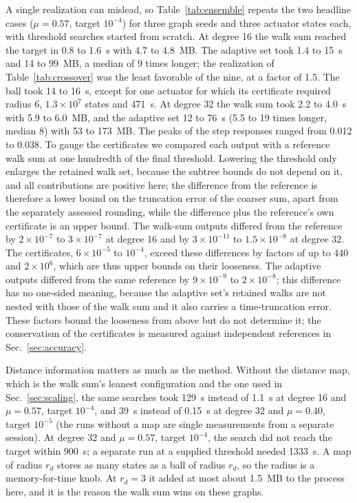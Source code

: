 A single realization can mislead, so Table~\ref{tab:ensemble} repeats the two headline cases ($\mu=0.57$, target $10^{-4}$) for three graph seeds and three actuator states each, with threshold searches started from scratch. At degree 16 the walk sum reached the target in 0.8 to 1.6~s with 4.7 to 4.8~MB. The adaptive set took 1.4 to 15~s and 14 to 99~MB, a median of 9 times longer; the realization of Table~\ref{tab:crossover} was the least favorable of the nine, at a factor of 1.5. The ball took 14 to 16~s, except for one actuator for which its certificate required radius 6, $1.3\times10^7$ states and 471~s. At degree 32 the walk sum took 2.2 to 4.0~s with 5.9 to 6.0~MB, and the adaptive set 12 to 76~s (5.5 to 19 times longer, median 8) with 53 to 173~MB. The peaks of the step responses ranged from 0.012 to 0.038. To gauge the certificates we compared each output with a reference walk sum at one hundredth of the final threshold. Lowering the threshold only enlarges the retained walk set, because the subtree bounds do not depend on it, and all contributions are positive here; the difference from the reference is therefore a lower bound on the truncation error of the coarser sum, apart from the separately assessed rounding, while the difference plus the reference's own certificate is an upper bound. The walk-sum outputs differed from the reference by $2\times10^{-7}$ to $3\times10^{-7}$ at degree 16 and by $3\times10^{-11}$ to $1.5\times10^{-8}$ at degree 32. The certificates, $6\times10^{-5}$ to $10^{-4}$, exceed these differences by factors of up to 440 and $2\times10^6$, which are thus upper bounds on their looseness. The adaptive outputs differed from the same reference by $9\times10^{-9}$ to $2\times10^{-8}$; this difference has no one-sided meaning, because the adaptive set's retained walks are not nested with those of the walk sum and it also carries a time-truncation error. These factors bound the looseness from above but do not determine it; the conservatism of the certificates is measured against independent references in Sec.~\ref{sec:accuracy}.



Distance information matters as much as the method. Without the distance map, which is the walk sum's leanest configuration and the one used in Sec.~\ref{sec:scaling}, the same searches took 129~s instead of 1.1~s at degree 16 and $\mu=0.57$, target $10^{-4}$, and 39~s instead of 0.15~s at degree 32 and $\mu=0.40$, target $10^{-5}$ (the runs without a map are single measurements from a separate session). At degree 32 and $\mu=0.57$, target $10^{-4}$, the search did not reach the target within 900~s; a separate run at a supplied threshold needed 1333~s. A map of radius $r_d$ stores as many states as a ball of radius $r_d$, so the radius is a memory-for-time knob. At $r_d=3$ it added at most about 1.5~MB to the process here, and it is the reason the walk sum wins on these graphs.


